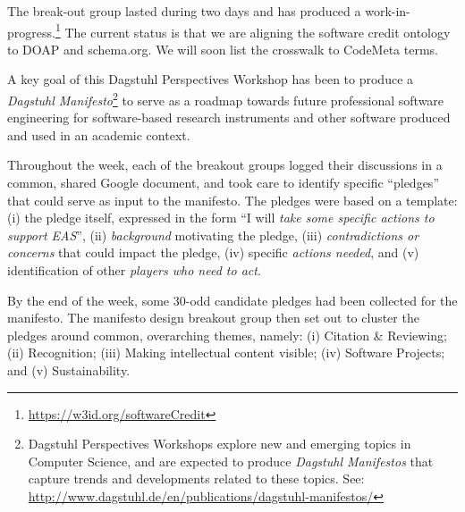 \documentclass[a4paper,UKenglish]{dagrep}
\begin{document}
The break-out group lasted during two days and has produced a work-in-progress.\footnote{\url{https://w3id.org/softwareCredit}} The current status is that we are aligning the software credit ontology to DOAP and schema.org. We will soon list the crosswalk to CodeMeta terms.








A key goal of this Dagstuhl Perspectives Workshop has been to produce a \emph{Dagstuhl Manifesto}\footnote{Dagstuhl Perspectives Workshops explore new and emerging topics in Computer Science, and are expected to produce \emph{Dagstuhl Manifestos} that capture trends and developments related to these topics. See: \url{http://www.dagstuhl.de/en/publications/dagstuhl-manifestos/}} to serve as a roadmap towards future professional software engineering for software-based research instruments and other software produced and used in an academic context.

Throughout the week, each of the breakout groups logged their discussions in a common, shared Google document, and took care to identify specific ``pledges'' that could serve as input to the manifesto. The pledges were based on a template: (i) the pledge itself, expressed in the form ``I will \emph{take some specific actions to support EAS}'', (ii) \emph{background} motivating the pledge, (iii) \emph{contradictions or concerns} that could impact the pledge, (iv) specific \emph{actions needed}, and (v) identification of other \emph{players who need to act}.

By the end of the week, some 30-odd candidate pledges had been collected for the manifesto.
The manifesto design breakout group then set out to cluster the pledges around common, overarching themes, namely:
(i) Citation \& Reviewing;
(ii) Recognition;
(iii) Making intellectual content visible;
(iv) Software Projects; and
(v) Sustainability.
\end{document}
